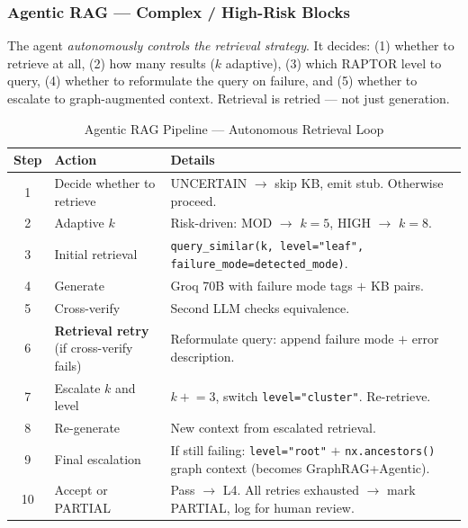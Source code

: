 \documentclass[11pt,a4paper]{article}
\begin{document}
\subsubsection{Agentic RAG — Complex / High-Risk Blocks}

\begin{infobox}
The agent \emph{autonomously controls the retrieval strategy}. It decides: (1) whether to retrieve at all, (2) how many results ($k$ adaptive), (3) which RAPTOR level to query, (4) whether to reformulate the query on failure, and (5) whether to escalate to graph-augmented context. Retrieval is retried — not just generation.
\end{infobox}

\begin{table}[H]
\centering
\caption{Agentic RAG Pipeline — Autonomous Retrieval Loop}
\renewcommand{\arraystretch}{1.3}
\small
\begin{tabularx}{\textwidth}{@{} c l X @{}}
\toprule
\textbf{Step} & \textbf{Action} & \textbf{Details} \\
\midrule
1 & Decide whether to retrieve & UNCERTAIN $\to$ skip KB, emit stub. Otherwise proceed. \\
2 & Adaptive $k$ & Risk-driven: MOD $\to$ $k{=}5$, HIGH $\to$ $k{=}8$. \\
3 & Initial retrieval & \texttt{query\_similar(k, level="leaf", failure\_mode=detected\_mode)}. \\
4 & Generate & Groq 70B with failure mode tags $+$ KB pairs. \\
5 & Cross-verify & Second LLM checks equivalence. \\
6 & \textbf{Retrieval retry} (if cross-verify fails) & Reformulate query: append failure mode $+$ error description. \\
7 & Escalate $k$ and level & $k \mathrel{+}= 3$, switch \texttt{level="cluster"}. Re-retrieve. \\
8 & Re-generate & New context from escalated retrieval. \\
9 & Final escalation & If still failing: \texttt{level="root"} $+$ \texttt{nx.ancestors()} graph context (becomes GraphRAG+Agentic). \\
10 & Accept or PARTIAL & Pass $\to$ L4. All retries exhausted $\to$ mark PARTIAL, log for human review. \\
\bottomrule
\end{tabularx}
\end{table}
\end{document}
